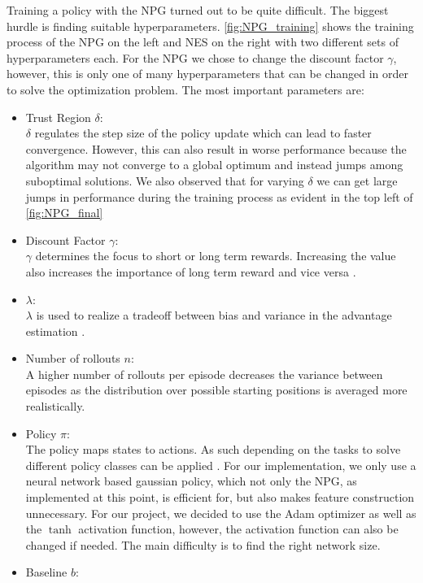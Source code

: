 Training a policy with the NPG turned out to be quite difficult. The biggest hurdle is finding suitable hyperparameters. \autoref{fig:NPG_training} shows the training process of the NPG on the left and NES on the right with two different sets of hyperparameters each. For the NPG we chose to change the discount factor $\gamma$, however, this is only one of many hyperparameters that can be changed in order to solve the optimization problem. \newpage
The most important parameters are:
\begin{itemize}
  \item Trust Region $\delta$: \\
  $\delta$ regulates the step size of the policy update which can lead to faster convergence. However, this can also result in worse performance because the algorithm may not converge to a global optimum and instead jumps among suboptimal solutions. We also observed that for varying $\delta$ we can get large jumps in performance during the training process as evident in the top left of \autoref{fig:NPG_final} \smallskip
  \item Discount Factor $\gamma$: \\
  $\gamma$ determines the focus to short or long term rewards. Increasing the value also increases the importance of long term reward and vice versa \cite{Schulman2018}. \smallskip
  \item $\lambda$: \\
  $\lambda$ is used to realize a tradeoff between bias and variance in the advantage estimation \cite{Schulman2018}. \smallskip
  \item Number of rollouts $n$: \\
  A higher number of rollouts per episode decreases the variance between episodes as the distribution over possible starting positions is averaged more realistically.\smallskip
  \item Policy $\pi$: \\
  The policy maps states to actions. As such depending on the tasks to solve different policy classes can be applied \cite{Rajeswaran2017}. For our implementation, we only use a neural network based gaussian policy, which not only the NPG, as implemented at this point, is efficient for, but also makes feature construction unnecessary. For our project, we decided to use the Adam optimizer as well as the $\tanh$ activation function, however, the activation function can also be changed if needed. The main difficulty is to find the right network size. \smallskip
  \item Baseline $b$: \\

\end{itemize}
